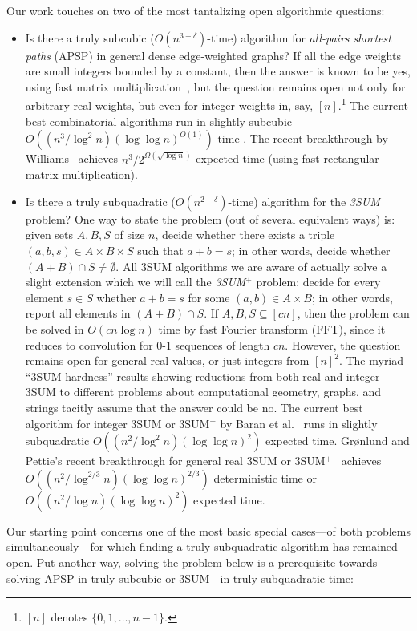 \documentclass[11pt]{article}
\begin{document}
Our work touches on two of the most tantalizing open algorithmic
questions:
\begin{itemize}
\item Is there a truly subcubic ($O(n^{3-\delta})$-time) algorithm
for \emph{all-pairs shortest paths} (APSP) in general dense edge-weighted
graphs?  If all the edge weights are small integers bounded
by a constant, then the
answer is known to be yes, using fast matrix multiplication~\cite{ZwickSURVEY},
but the question remains open not only for arbitrary real weights,
but even for integer weights in, say, $[n]$.\footnote{$[n]$ denotes $\{0,1,\ldots,n-1\}$.}
The current best combinatorial algorithms run
in slightly subcubic $O((n^3/\log^2 n)(\log\log n)^{O(1)})$ time \cite{Chan10,HanTak}.  The recent breakthrough by
Williams~\cite{Williams14} achieves
$n^3 / 2^{\Omega(\sqrt{\log n})}$ expected time (using
fast rectangular matrix multiplication).
\item Is there a truly subquadratic ($O(n^{2-\delta})$-time) algorithm for the
\emph{3SUM} problem?  One way to state the problem (out of
several equivalent ways) is:
given sets $A,B,S$ of size $n$, decide whether
there exists a triple $(a,b,s) \in A\times B\times S$ such that $a+b=s$; in other words, decide whether
$(A+B)\cap S \not= \emptyset$.
All 3SUM algorithms we are aware of actually solve
a slight extension which we will call
the \emph{3SUM$^+$} problem:
decide for every element $s\in S$ whether
$a+b=s$ for some $(a,b)\in A\times B$; in other words,
report all elements in $(A+B)\cap S$.
If $A,B,S\subseteq [cn]$, then the problem can
be solved in $O(cn\log n)$ time by fast Fourier transform (FFT),
since it reduces to convolution for 0-1 sequences of length $cn$.
However, the question remains open
for general real values, or just integers from $[n]^2$.
The myriad ``3SUM-hardness'' results showing reductions
from both real and integer 3SUM to different problems
about computational geometry, graphs, and strings
\cite{GO95,Patrascu10,BDP08,PW10,VW09,AWW14,ACLL14,JV13,KPP14} tacitly
assume that the answer could be no.
The current best algorithm for integer 3SUM or 3SUM$^+$ by
Baran et al.~\cite{BDP08} runs in slightly subquadratic
$O((n^2/\log^2 n)(\log\log n)^2)$ expected time.
Gr\o nlund and Pettie's recent breakthrough for
general real 3SUM or 3SUM$^+$~\cite{GP14} achieves
$O((n^2/\log^{2/3}n)(\log\log n)^{2/3})$ deterministic
time or $O((n^2/\log n)(\log\log n)^2)$ expected time.
\end{itemize}

Our starting point concerns one of the most basic special cases---of both problems simultaneously---for which finding a truly subquadratic algorithm has remained open.  Put another way, solving the problem below is
a prerequisite towards solving APSP in truly subcubic
or 3SUM$^+$ in truly subquadratic time:
\end{document}
